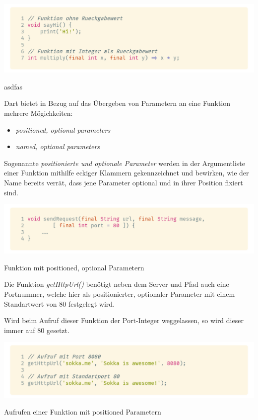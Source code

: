 \begin{code}
    \centering
    \includegraphics[width=1\textwidth]{images/Dart/dartFunctions.png}
    \caption{asdfas}
\end{code}

Dart bietet in Bezug auf das Übergeben von Parametern an eine Funktion mehrere Mögichkeiten:
\begin{itemize}
    \item \textit{positioned, optional parameters}
    \item \textit{named, optional parameters}
\end{itemize}

Sogenannte \textit{positionierte und optionale Parameter} werden in der Argumentliste einer Funktion
mithilfe eckiger Klammern gekennzeichnet und bewirken, wie der Name bereits verrät, dass jene Parameter
optional und in ihrer Position fixiert sind.

\begin{code}
    \centering
    \includegraphics[width=1\textwidth]{images/Dart/dartPositionedArgumentsFunction.png}
    \caption{Funktion mit positioned, optional Parametern}
\end{code}

Die Funktion \textit{getHttpUrl()} benötigt neben dem Server und Pfad auch eine Portnummer, welche
hier als positionierter, optionaler Parameter mit einem Standartwert von 80 festgelegt wird.

Wird beim Aufruf dieser Funktion der Port-Integer weggelassen, so wird dieser immer auf 80 gesetzt.

\begin{code}
    \centering
    \includegraphics[width=1\textwidth]{images/Dart/dartCallPositionedFunction.png}
    \caption{Aufrufen einer Funktion mit positioned Parametern}
\end{code}


